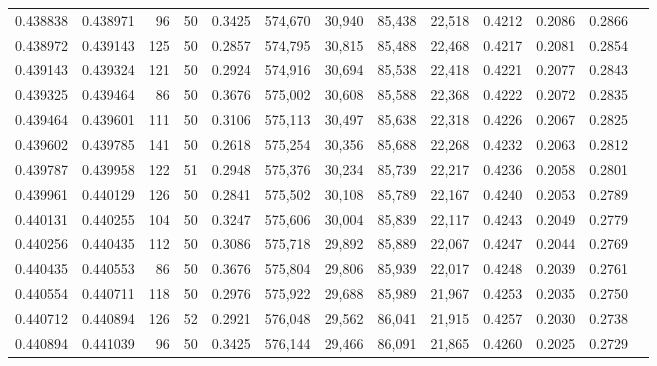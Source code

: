 \begin{tabular}{rrrrrrrrrrrrr}
0.438838 & 0.438971 &    96 &  50 &                                     0.3425 & 574,670 &  30,940 &  85,438 &  22,518 & 0.4212 & 0.2086 & 0.2866 \\
0.438972 & 0.439143 &   125 &  50 &                                     0.2857 & 574,795 &  30,815 &  85,488 &  22,468 & 0.4217 & 0.2081 & 0.2854 \\
0.439143 & 0.439324 &   121 &  50 &                                     0.2924 & 574,916 &  30,694 &  85,538 &  22,418 & 0.4221 & 0.2077 & 0.2843 \\
0.439325 & 0.439464 &    86 &  50 &                                     0.3676 & 575,002 &  30,608 &  85,588 &  22,368 & 0.4222 & 0.2072 & 0.2835 \\
0.439464 & 0.439601 &   111 &  50 &                                     0.3106 & 575,113 &  30,497 &  85,638 &  22,318 & 0.4226 & 0.2067 & 0.2825 \\
0.439602 & 0.439785 &   141 &  50 &                                     0.2618 & 575,254 &  30,356 &  85,688 &  22,268 & 0.4232 & 0.2063 & 0.2812 \\
0.439787 & 0.439958 &   122 &  51 &                                     0.2948 & 575,376 &  30,234 &  85,739 &  22,217 & 0.4236 & 0.2058 & 0.2801 \\
0.439961 & 0.440129 &   126 &  50 &                                     0.2841 & 575,502 &  30,108 &  85,789 &  22,167 & 0.4240 & 0.2053 & 0.2789 \\
0.440131 & 0.440255 &   104 &  50 &                                     0.3247 & 575,606 &  30,004 &  85,839 &  22,117 & 0.4243 & 0.2049 & 0.2779 \\
0.440256 & 0.440435 &   112 &  50 &                                     0.3086 & 575,718 &  29,892 &  85,889 &  22,067 & 0.4247 & 0.2044 & 0.2769 \\
0.440435 & 0.440553 &    86 &  50 &                                     0.3676 & 575,804 &  29,806 &  85,939 &  22,017 & 0.4248 & 0.2039 & 0.2761 \\
0.440554 & 0.440711 &   118 &  50 &                                     0.2976 & 575,922 &  29,688 &  85,989 &  21,967 & 0.4253 & 0.2035 & 0.2750 \\
0.440712 & 0.440894 &   126 &  52 &                                     0.2921 & 576,048 &  29,562 &  86,041 &  21,915 & 0.4257 & 0.2030 & 0.2738 \\
0.440894 & 0.441039 &    96 &  50 &                                     0.3425 & 576,144 &  29,466 &  86,091 &  21,865 & 0.4260 & 0.2025 & 0.2729 \\

\end{tabular}
